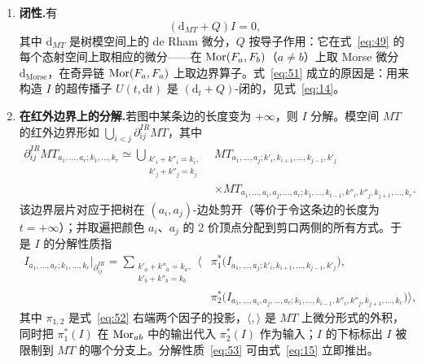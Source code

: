 \begin{enumerate}
  \item[(i)] \textbf{闭性.}\quad 有
  \begin{equation}\tag{51}\label{eq:51}
    (\mathrm{d}_{MT}+Q)I=0,
  \end{equation}
  其中 $\mathrm{d}_{MT}$ 是树模空间上的 de Rham 微分，$Q$ 按导子作用：它在式~\eqref{eq:49} 的每个态射空间上取相应的微分——在 $\operatorname{Mor}(F_a,F_b)$（$a\neq b$）上取 Morse 微分 $\mathrm{d}_{\mathrm{Morse}}$，在奇异链 $\operatorname{Mor}(F_a,F_a)$ 上取边界算子。式~\eqref{eq:51} 成立的原因是：用来构造 $I$ 的超传播子 $U(t,\mathrm{d}t)$ 是 $(\mathrm{d}_t+Q)$-闭的，见式~\eqref{eq:14}。


  \item[(ii)] \textbf{在红外边界上的分解.}\quad 若图中某条边的长度变为 $+\infty$，则 $I$ 分解。模空间 $MT$ 的红外边界形如 $\bigcup_{i<j}\partial^{IR}_{ij}MT$，其中
  \begin{equation}\tag{52}\label{eq:52}
  \begin{aligned}
  \partial^{IR}_{ij}MT_{a_1,\dots,a_r;k_1,\dots,k_r}\simeq\bigcup_{\substack{k'_i+k''_i=k_i,\\ k'_j+k''_j=k_j}}&MT_{a_1,\dots,a_j;k'_i,k_{i+1},\dots,k_{j-1},k'_j}\\
  &\times MT_{a_1,\dots,a_i,a_j,\dots,a_r;k_1,\dots,k_{i-1},k''_i,k''_j,k_{j+1},\dots,k_r}.
  \end{aligned}
  \end{equation}
  该边界层片对应于把树在 $(a_i,a_j)$-边处剪开（等价于令这条边的长度为 $t=+\infty$）；并取遍把颜色 $a_i$、$a_j$ 的 2 价顶点分配到剪口两侧的所有方式。于是 $I$ 的分解性质指
  \begin{equation}\tag{53}\label{eq:53}
  \begin{aligned}
  I_{a_1,\dots,a_r;k_1,\dots,k_r}\big|_{\partial^{IR}_{ij}}=\sum_{\substack{k'_a+k''_a=k_a,\\ k'_b+k''_b=k_b}}\big\langle&\pi_1^*\bigl(I_{a_1,\dots,a_j;k'_i,k_{i+1},\dots,k_{j-1},k'_j}\bigr),\\
  &\pi_2^*\bigl(I_{a_1,\dots,a_i,a_j,\dots,a_r;k_1,\dots,k_{i-1},k''_i,k''_j,k_{j+1},\dots,k_r}\bigr)\big\rangle,
  \end{aligned}
  \end{equation}
  其中 $\pi_{1,2}$ 是式~\eqref{eq:52} 右端两个因子的投影，$\langle,\rangle$ 是 $MT$ 上微分形式的外积，同时把 $\pi_1^*(I)$ 在 $\operatorname{Mor}_{ab}$ 中的输出代入 $\pi_2^*(I)$ 作为输入；$I$ 的下标标出 $I$ 被限制到 $MT$ 的哪个分支上。分解性质~\eqref{eq:53} 可由式~\eqref{eq:15} 立即推出。


\end{enumerate}
